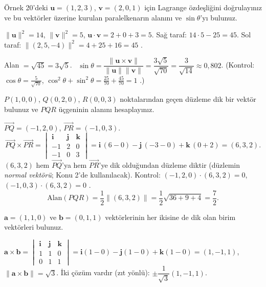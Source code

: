 \begin{soru}
Örnek 20'deki $\mathbf u=(1,2,3)$, $\mathbf v=(2,0,1)$ için Lagrange özdeşliğini doğrulayınız ve bu vektörler üzerine kurulan paralelkenarın alanını ve $\sin\theta$'yı bulunuz.
\end{soru}
\begin{cevap}
$\|\mathbf u\|^2=14$, $\|\mathbf v\|^2=5$, $\mathbf u\cdot\mathbf v=2+0+3=5$. Sağ taraf: $14\cdot5-25=45$. Sol taraf: $\|(2,5,-4)\|^2=4+25+16=45$ \checkmark.

Alan $=\sqrt{45}=3\sqrt5$. \ $\sin\theta=\dfrac{\|\mathbf u\times\mathbf v\|}{\|\mathbf u\|\|\mathbf v\|}=\dfrac{3\sqrt5}{\sqrt{70}}=\dfrac{3}{\sqrt{14}}\approx0{,}802$.
(Kontrol: $\cos\theta=\frac{5}{\sqrt{70}}$, $\cos^2\theta+\sin^2\theta=\frac{25}{70}+\frac{45}{70}=1$ \checkmark.)
\end{cevap}

\begin{soru}
$P(1,0,0)$, $Q(0,2,0)$, $R(0,0,3)$ noktalarından geçen düzleme dik bir vektör bulunuz ve $PQR$ üçgeninin alanını hesaplayınız.
\end{soru}
\begin{cevap}
$\overrightarrow{PQ}=(-1,2,0)$, $\overrightarrow{PR}=(-1,0,3)$.
\[
\overrightarrow{PQ}\times\overrightarrow{PR}=\begin{vmatrix}\mathbf i&\mathbf j&\mathbf k\\-1&2&0\\-1&0&3\end{vmatrix}
=\mathbf i\,(6-0)-\mathbf j\,(-3-0)+\mathbf k\,(0+2)=(6,3,2).
\]
$(6,3,2)$ hem $\overrightarrow{PQ}$'ya hem $\overrightarrow{PR}$'ye dik olduğundan düzleme diktir (düzlemin \emph{normal vektörü}; Konu 2'de kullanılacak). Kontrol: $(-1,2,0)\cdot(6,3,2)=0$, $(-1,0,3)\cdot(6,3,2)=0$ \checkmark.
\[
\text{Alan}(PQR)=\frac12\|(6,3,2)\|=\frac12\sqrt{36+9+4}=\frac72 .
\]
\end{cevap}

\begin{soru}
$\mathbf a=(1,1,0)$ ve $\mathbf b=(0,1,1)$ vektörlerinin her ikisine de dik olan birim vektörleri bulunuz.
\end{soru}
\begin{cevap}
$\mathbf a\times\mathbf b=\begin{vmatrix}\mathbf i&\mathbf j&\mathbf k\\1&1&0\\0&1&1\end{vmatrix}=\mathbf i(1-0)-\mathbf j(1-0)+\mathbf k(1-0)=(1,-1,1)$, \ $\|\mathbf a\times\mathbf b\|=\sqrt3$.
İki çözüm vardır (zıt yönlü): $\pm\dfrac{1}{\sqrt3}(1,-1,1)$.
\end{cevap}

